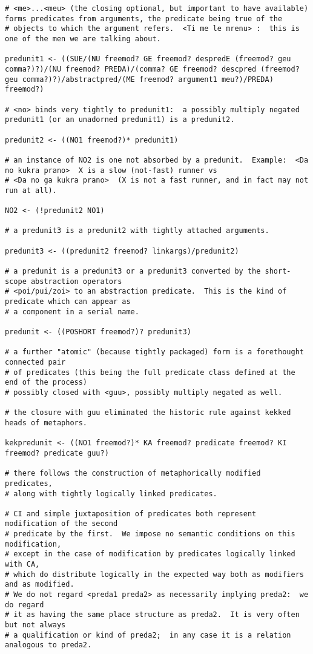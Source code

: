 \documentclass[12pt]{book}
\begin{document}
{\begin{verbatim}
# <me>...<meu> (the closing optional, but important to have available) forms predicates from arguments, the predicate being true of the
# objects to which the argument refers.  <Ti me le mrenu> :  this is one of the men we are talking about.

predunit1 <- ((SUE/(NU freemod? GE freemod? despredE (freemod? geu comma?)?)/(NU freemod? PREDA)/(comma? GE freemod? descpred (freemod? geu comma?)?)/abstractpred/(ME freemod? argument1 meu?)/PREDA) freemod?)

# <no> binds very tightly to predunit1:  a possibly multiply negated predunit1 (or an unadorned predunit1) is a predunit2.

predunit2 <- ((NO1 freemod?)* predunit1)

# an instance of NO2 is one not absorbed by a predunit.  Example:  <Da no kukra prano>  X is a slow (not-fast) runner vs
# <Da no ga kukra prano>  (X is not a fast runner, and in fact may not run at all).

NO2 <- (!predunit2 NO1)

# a predunit3 is a predunit2 with tightly attached arguments.

predunit3 <- ((predunit2 freemod? linkargs)/predunit2)

# a predunit is a predunit3 or a predunit3 converted by the short-scope abstraction operators
# <poi/pui/zoi> to an abstraction predicate.  This is the kind of predicate which can appear as
# a component in a serial name.

predunit <- ((POSHORT freemod?)? predunit3)

# a further "atomic" (because tightly packaged) form is a forethought connected pair
# of predicates (this being the full predicate class defined at the end of the process)
# possibly closed with <guu>, possibly multiply negated as well.

# the closure with guu eliminated the historic rule against kekked heads of metaphors.

kekpredunit <- ((NO1 freemod?)* KA freemod? predicate freemod? KI freemod? predicate guu?)

# there follows the construction of metaphorically modified predicates, 
# along with tightly logically linked predicates.

# CI and simple juxtaposition of predicates both represent modification of the second
# predicate by the first.  We impose no semantic conditions on this modification,
# except in the case of modification by predicates logically linked with CA,
# which do distribute logically in the expected way both as modifiers and as modified.
# We do not regard <preda1 preda2> as necessarily implying preda2:  we do regard
# it as having the same place structure as preda2.  It is very often but not always
# a qualification or kind of preda2;  in any case it is a relation analogous to preda2.


\end{verbatim}}
\end{document}
